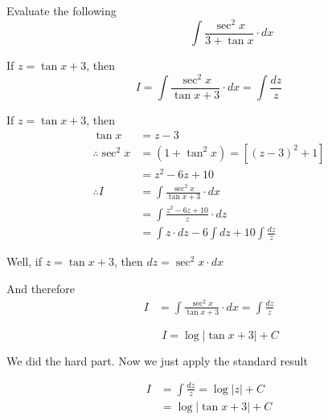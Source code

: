 \documentclass[14pt,fleqn]{extarticle}
\begin{document}
Evaluate the following \[\qquad \qquad \int\dfrac{\sec^2 x}{3 + \tan x}\cdot dx \]
%

\newcard 

If $z = \tan x + 3$, then 
\[ I = \int \frac{\sec^2 x}{\tan x+3}\cdot dx = \int \frac{dz}{z} \]

\newcard 

If $z = \tan x + 3$, then 
\begin{align}
	\tan x &= z-3 \\
	\therefore \sec^2 x &= \left(1+\tan^2 x \right) = \left[\left(z-3 \right)^2 + 1 \right] \\
	&= z^2 -6z + 10  \\
	\therefore I &= \int \frac{\sec^2 x}{\tan x + 3}\cdot dx \\
	&= \int \frac{z^2-6z + 10}{z}\cdot dz \\ 
	&= \int z\cdot dz - 6\int dz + 10\int \frac{dz}{z}
\end{align}

\newcard 

Well, if $z = \tan x + 3$, then $dz = \sec^2 x\cdot dx$\newline 

And therefore 
\begin{align}
	I &= \int \frac{\sec^2 x}{\tan x+3}\cdot dx = \int \frac{dz}{z}
\end{align}

\newcard 

\[ \qquad I = \log \vert \tan x + 3\vert + C \] 

\newcard 

We did the hard part. Now we just apply the standard result 

\begin{align}
	I &= \int \frac{dz}{z} = \log \vert z\vert  + C \\ 
	&= \log \vert \tan x + 3\vert + C 
\end{align}
\end{document}
